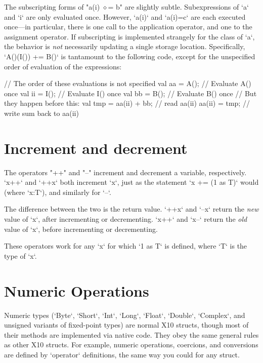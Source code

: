 The subscripting forms of \xcdmath"a(i) $\diamond$= b" are slightly subtle.
Subexpressions of \xcd`a` and \xcd`i` are only evaluated once.  However,
\xcd`a(i)` and \xcd`a(i)=c` are each executed once---in particular, there is
one call to the application operator, and one to the assignment operator.
If subscripting is implemented strangely for
the class of \xcd`a`, the behavior is {\em not} necessarily updating a single
storage location. Specifically, \xcd`A()(I()) += B()` is tantamount to the
following code, except for the unspecified order of evaluation of the expressions: 
\begin{xten}
{
  // The order of these evaluations is not specified
  val aa = A();  // Evaluate A() once
  val ii = I();  // Evaluate I() once
  val bb = B();  // Evaluate B() once
  // But they happen before this:
  val tmp = aa(ii) + bb; // read aa(ii)
  aa(ii) = tmp;  // write sum back to aa(ii)
}
\end{xten}

\section{Increment and decrement}
\index{\Xcd{++}}
\index{\Xcd{--}}


The operators \xcd"++" and \xcd"--" increment and decrement
a variable, respectively.  
\xcd`x++` and \xcd`++x` both increment \xcd`x`, just as the statement 
\xcd`x += (1 as T)` would (where \xcd`x:T`), and similarly for \xcd`--`.  

The difference between the two is the return value.  
\xcd`++x` and \xcd`--x` return the {\em new} value of \xcd`x`, after
incrementing or decrementing.
\xcd`x++` and \xcd`x--` return the {\em old} value of \xcd`x`, before
incrementing or decrementing.

These operators work for any \xcd`x` for which \xcd`1 as T` is defined, where
\xcd`T` is the type of \xcd`x`.  


\section{Numeric Operations}
\label{XtenPromotions}

Numeric types (\xcd`Byte`, \xcd`Short`, \xcd`Int`, \xcd`Long`, \xcd`Float`,
\xcd`Double`, \xcd`Complex`, and unsigned variants of fixed-point types) are normal X10
structs, though most of their methods are implemented via native code. They
obey the same general rules as other X10 structs. For example, numeric
operations, coercions, and conversions are defined by \xcd`operator` definitions, the same way you could
for any struct.

